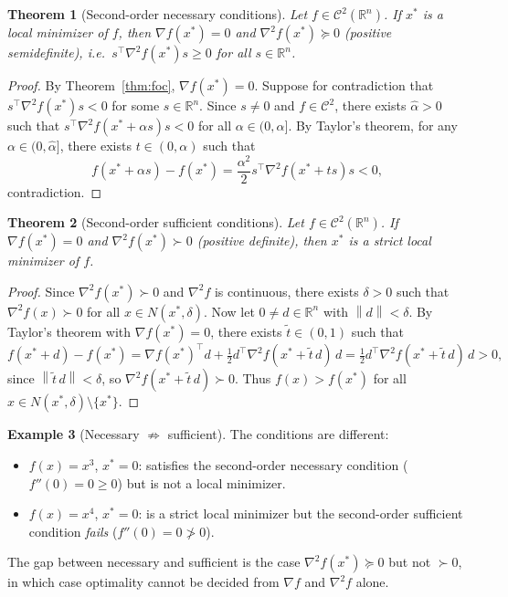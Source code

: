 \documentclass[11pt,a4paper]{report}
\theoremstyle{plain}
\newtheorem{theorem}{Theorem}[chapter]
\theoremstyle{definition}
\newtheorem{example}[theorem]{Example}
\newcommand{\R}{\mathbb{R}}
\newcommand{\norm}[1]{\left\lVert#1\right\rVert}
\newcommand{\grad}{\nabla}
\newcommand{\hess}{\nabla^{2}}
\newcommand{\trans}{^{\top}}
\begin{document}
\begin{theorem}[Second-order necessary conditions]\label{thm:soc-nec}
Let $f\in\mathcal{C}^{2}(\R^{n})$. If $x^{*}$ is a local minimizer of $f$,
then $\grad f(x^{*})=0$ and $\hess f(x^{*})\succeq 0$ (positive semidefinite),
i.e.\ $s\trans\hess f(x^{*})s\ge 0$ for all $s\in\R^{n}$.
\end{theorem}
\begin{proof}
  By Theorem~\ref{thm:foc}, $\grad f(x^{*})=0$. Suppose for contradiction that $s\trans\hess f(x^{*})s < 0$ for some $s \in \R^{n}$. Since $s \neq 0$ and $f \in \mathcal{C}^2$, there exists $\hat{\alpha} > 0$ such that $s\trans\hess f(x^{*} + \alpha s)s < 0$ for all $\alpha \in (0, \hat{\alpha}]$. By Taylor's theorem, for any $\alpha \in (0, \hat{\alpha}]$, there exists $t \in (0, \alpha)$ such that
  \[
    f(x^{*} + \alpha s) - f(x^{*}) = \frac{\alpha^2}{2} s\trans\hess f(x^{*} + t s)s < 0,
  \]
  contradiction.
\end{proof}

\begin{theorem}[Second-order sufficient conditions]\label{thm:soc-suf}
Let $f\in\mathcal{C}^{2}(\R^{n})$. If $\grad f(x^{*})=0$ and $\hess f(x^{*})\succ 0$
(positive definite), then $x^{*}$ is a strict local minimizer of $f$.
\end{theorem}
\begin{proof}
  Since $\hess f(x^{*})\succ 0$ and $\hess f$ is continuous, there exists $\delta>0$ such that $\hess f(x)\succ 0$ for all $x\in N(x^{*},\delta)$. Now let $0\ne d\in\R^{n}$ with $\norm{d}<\delta$. By Taylor's theorem with $\grad f(x^{*})=0$, there exists $\tilde{t}\in(0,1)$ such that
  \[
    f(x^{*}+d)-f(x^{*})
    =\grad f(x^{*})\trans d+\tfrac12 d\trans\hess f(x^{*}+\tilde{t}\,d)\,d
    =\tfrac12 d\trans\hess f(x^{*}+\tilde{t}\,d)\,d>0,
  \]
  since $\norm{\tilde{t}\,d}<\delta$, so $\hess f(x^{*}+\tilde{t}\,d)\succ 0$. Thus $f(x)>f(x^{*})$ for all $x\in N(x^{*},\delta)\setminus\{x^{*}\}$.
\end{proof}

\begin{example}[Necessary $\not\Rightarrow$ sufficient]
The conditions are different:
\begin{itemize}[leftmargin=2em,itemsep=0pt]
  \item $f(x)=x^{3}$, $x^{*}=0$: satisfies the second-order necessary condition
        ($f''(0)=0\ge 0$) but is not a local minimizer.
  \item $f(x)=x^{4}$, $x^{*}=0$: is a strict local minimizer but the second-order
        sufficient condition \emph{fails} ($f''(0)=0\not>0$).
\end{itemize}
The gap between necessary and sufficient is the case $\hess f(x^{*})\succeq 0$ but
not $\succ 0$, in which case optimality cannot be decided from $\grad f$ and
$\hess f$ alone.
\end{example}
\end{document}

